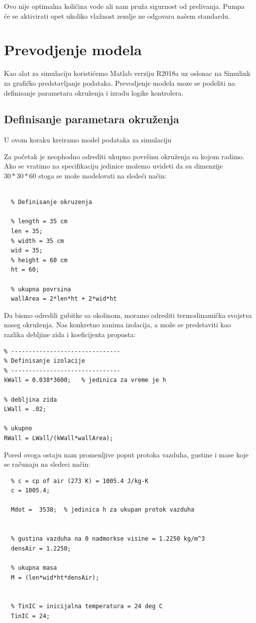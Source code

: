 \documentclass[a4paper,11pt]{book}
\begin{document}
Ovo nije optimalna količina vode ali nam pruža sigurnost od prelivanja. Pumpa će se aktivirati opet ukoliko vlažnost zemlje ne odgovara našem standardu.

\section{Prevodjenje modela}

Kao alat za simulaciju koristićemo Matlab verziju R2018a uz oslonac na Simulink za grafičko predstavljanje podataka. Prevodjenje modela moze se podeliti na definisanje parametara okruženja i izradu logike kontrolera. 

\subsection{Definisanje parametara okruženja}

U ovom koraku kreiramo model podataka za simulaciju

Za početak je neophodno odrediti ukupno površinu okruženja sa kojom radimo. Ako se vratimo na specifikaciju jedinice možemo uvideti da su dimenzije $30*30*60$ stoga se može modelovati na sledeći način:

\begin{lstlisting}

  % Definisanje okruzenja

  % length = 35 cm
  len = 35;
  % width = 35 cm
  wid = 35;
  % height = 60 cm
  ht = 60;

  % ukupna povrsina
  wallArea = 2*len*ht + 2*wid*ht
  \end{lstlisting}

Da bismo odredili gubitke sa okolinom, moramo odrediti termodinamička svojstva naseg okruženja. Nas konkretno zanima izolacija, a može se predstaviti kao razlika debljine zida i koeficijenta propusta:\\

\begin{lstlisting}
% -------------------------------
% Definisanje izolacije
% -------------------------------
kWall = 0.038*3600;   % jedinica za vreme je h

% debljina zida
LWall = .02;

% ukupno
RWall = LWall/(kWall*wallArea);
\end{lstlisting}

Pored ovoga ostaju nam promenljive poput protoka vazduha, gustine i mase koje se računaju na sledeci način:

\begin{lstlisting}
  % c = cp of air (273 K) = 1005.4 J/kg-K
  c = 1005.4;
  
  Mdot =  3538;  % jedinica h za ukupan protok vazduha
  
  
  % gustina vazduha na 0 nadmorkse visine = 1.2250 kg/m^3
  densAir = 1.2250;
  
  % ukupna masa
  M = (len*wid*ht*densAir);
  
  
  % TinIC = inicijalna temperatura = 24 deg C
  TinIC = 24;
  \end{lstlisting}
\end{document}
